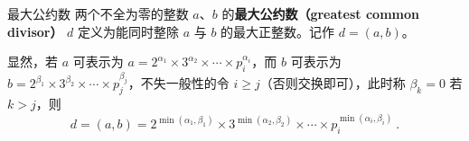 
\begin{definition}{最大公约数}
两个不全为零的整数 $a$、$b$ 的\textbf{最大公约数（greatest common divisor）} $d$ 定义为能同时整除 $a$ 与 $b$ 的最大正整数。记作 $d = (a, b)$。
\end{definition}
显然，若 $a$ 可表示为 $a = 2^{\alpha_1} \times 3^{\alpha_2} \times \cdots \times p_i^{\alpha_i}$，而 $b$ 可表示为 $b = 2^{\beta_1} \times 3^{\beta_2} \times \cdots \times p_j^{\beta_j}$，不失一般性的令 $i \ge j$（否则交换即可），此时称 $\beta_k = 0$ 若 $k > j$，则
\begin{equation}
d = (a, b) = 2^{\min(\alpha_1, \beta_1)} \times 3^{\min(\alpha_2, \beta_2)} \times \cdots \times p_i^{\min(\alpha_i, \beta_i)} ~.
\end{equation}
